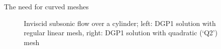 \documentclass[t,12pt]{beamer}
\begin{document}
\begin{frame}{The need for curved meshes}
 \begin{figure}
 	\centering
 	\caption{Inviscid subsonic flow over a cylinder; left: DGP1 solution with regular linear mesh, right: DGP1 solution with quadratic (`Q2') mesh }
 	\label{fig:bassi}
 \end{figure}
\end{frame}
\end{document}
